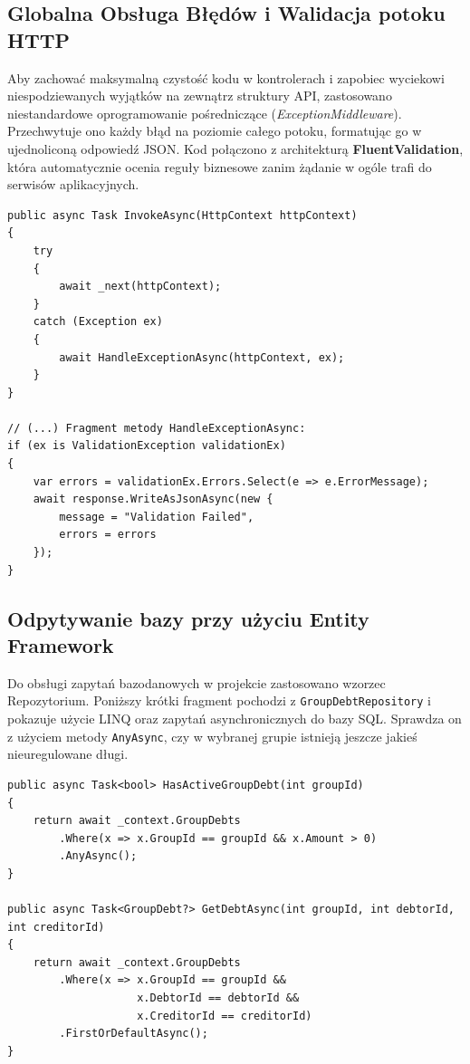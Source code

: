 \documentclass[12pt, a4paper]{article}
\begin{document}
\subsection{Globalna Obsługa Błędów i Walidacja potoku HTTP}
Aby zachować maksymalną czystość kodu w kontrolerach i zapobiec wyciekowi niespodziewanych wyjątków na zewnątrz struktury API, zastosowano niestandardowe oprogramowanie pośredniczące (\textit{ExceptionMiddleware}). Przechwytuje ono każdy błąd na poziomie całego potoku, formatując go w ujednoliconą odpowiedź JSON. Kod połączono z architekturą \textbf{FluentValidation}, która automatycznie ocenia reguły biznesowe zanim żądanie w ogóle trafi do serwisów aplikacyjnych.
\begin{center}
\begin{verbatim}
public async Task InvokeAsync(HttpContext httpContext)
{
    try
    {
        await _next(httpContext);
    }
    catch (Exception ex)
    {
        await HandleExceptionAsync(httpContext, ex);
    }
}

// (...) Fragment metody HandleExceptionAsync:
if (ex is ValidationException validationEx)
{
    var errors = validationEx.Errors.Select(e => e.ErrorMessage);
    await response.WriteAsJsonAsync(new { 
        message = "Validation Failed", 
        errors = errors 
    });
}
\end{verbatim}
\end{center}

\subsection{Odpytywanie bazy przy użyciu Entity Framework}
Do obsługi zapytań bazodanowych w projekcie zastosowano wzorzec Repozytorium. Poniższy krótki fragment pochodzi z \texttt{GroupDebtRepository} i pokazuje użycie LINQ oraz zapytań asynchronicznych do bazy SQL. Sprawdza on z użyciem metody \texttt{AnyAsync}, czy w wybranej grupie istnieją jeszcze jakieś nieuregulowane długi.
\begin{center}
\begin{verbatim}
public async Task<bool> HasActiveGroupDebt(int groupId)
{
    return await _context.GroupDebts
        .Where(x => x.GroupId == groupId && x.Amount > 0)
        .AnyAsync();
}

public async Task<GroupDebt?> GetDebtAsync(int groupId, int debtorId, int creditorId)
{
    return await _context.GroupDebts
        .Where(x => x.GroupId == groupId && 
                    x.DebtorId == debtorId && 
                    x.CreditorId == creditorId)
        .FirstOrDefaultAsync();
}
\end{verbatim}
\end{center}
\end{document}

